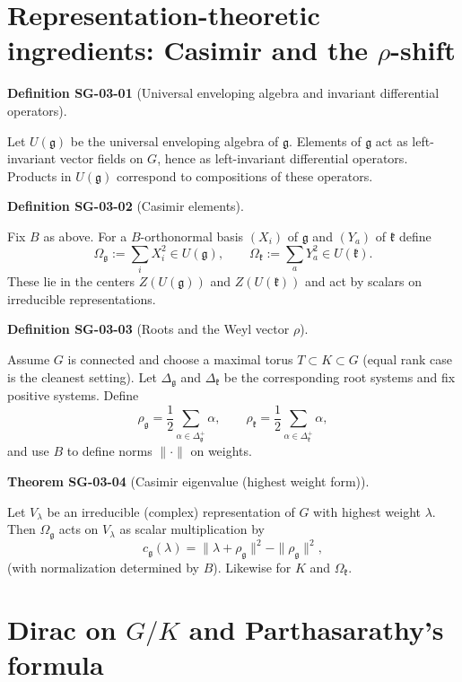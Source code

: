 \documentclass[10pt, letterpaper]{article}
\newcommand{\CustomHeading}[3]{%
  \par\medskip\noindent%
  \textbf{#1 #2} \textnormal{(#3)}.\enskip%
}
\newenvironment{DEF}[2]{\begin{unitbox}\CustomHeading{Definition}{#1}{#2}}{\end{unitbox}}
\newenvironment{THEO}[2]{\begin{unitbox}\CustomHeading{Theorem}{#1}{#2}}{\end{unitbox}}
\begin{document}
\section{Representation-theoretic ingredients: Casimir and the $\rho$-shift}

\begin{DEF}{SG-03-01}{Universal enveloping algebra and invariant differential operators}
Let $U(\mathfrak g)$ be the universal enveloping algebra of $\mathfrak g$.
Elements of $\mathfrak g$ act as left-invariant vector fields on $G$, hence as left-invariant differential operators.
Products in $U(\mathfrak g)$ correspond to compositions of these operators.
\end{DEF}

\begin{DEF}{SG-03-02}{Casimir elements}
Fix $B$ as above.
For a $B$-orthonormal basis $(X_i)$ of $\mathfrak g$ and $(Y_a)$ of $\mathfrak k$ define
\[
\Omega_{\mathfrak g}:=\sum_i X_i^2\in U(\mathfrak g),
\qquad
\Omega_{\mathfrak k}:=\sum_a Y_a^2\in U(\mathfrak k).
\]
These lie in the centers $Z(U(\mathfrak g))$ and $Z(U(\mathfrak k))$ and act by scalars on irreducible representations.
\end{DEF}

\begin{DEF}{SG-03-03}{Roots and the Weyl vector $\rho$}
Assume $G$ is connected and choose a maximal torus $T\subset K\subset G$ (equal rank case is the cleanest setting).
Let $\Delta_{\mathfrak g}$ and $\Delta_{\mathfrak k}$ be the corresponding root systems and fix positive systems.
Define
\[
\rho_{\mathfrak g}=\frac12\sum_{\alpha\in \Delta_{\mathfrak g}^+}\alpha,
\qquad
\rho_{\mathfrak k}=\frac12\sum_{\alpha\in \Delta_{\mathfrak k}^+}\alpha,
\]
and use $B$ to define norms $\|\cdot\|$ on weights.
\end{DEF}

\begin{THEO}{SG-03-04}{Casimir eigenvalue (highest weight form)}
Let $V_\lambda$ be an irreducible (complex) representation of $G$ with highest weight $\lambda$.
Then $\Omega_{\mathfrak g}$ acts on $V_\lambda$ as scalar multiplication by
\[
c_{\mathfrak g}(\lambda)=\|\lambda+\rho_{\mathfrak g}\|^2-\|\rho_{\mathfrak g}\|^2,
\]
(with normalization determined by $B$). Likewise for $K$ and $\Omega_{\mathfrak k}$.
\end{THEO}

\section{Dirac on $G/K$ and Parthasarathy's formula}
\end{document}
